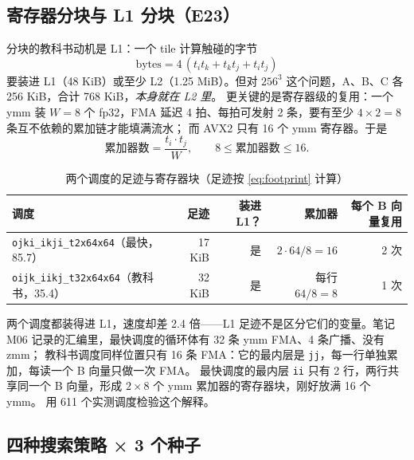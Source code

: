 \documentclass[11pt,a4paper]{ctexart}
\newcommand{\sk}[1]{\texttt{#1}}
\begin{document}
\subsection{寄存器分块与 L1 分块（E23）}\label{sec:regblock}

分块的教科书动机是 L1：一个 tile 计算触碰的字节
\begin{equation*}\label{eq:footprint}
  \text{bytes} = 4\,(t_i t_k + t_k t_j + t_i t_j) \tag{E23a}
\end{equation*}
要装进 L1（48 KiB）或至少 L2（1.25 MiB）。但对 $256^3$ 这个问题，A、B、C 各 256 KiB，合计 768 KiB，\emph{本身就在 L2 里}。
更关键的是寄存器级的复用：一个 ymm 装 $W=8$ 个 fp32，FMA 延迟 4 拍、每拍可发射 2 条，要有至少 $4\times2=8$ 条互不依赖的累加链才能填满流水；
而 AVX2 只有 16 个 ymm 寄存器。于是
\begin{equation*}\label{eq:acc}
  \text{累加器数} = \frac{t_i\cdot t_j}{W},\qquad 8 \le \text{累加器数} \le 16. \tag{E23b}
\end{equation*}

\begin{table}[H]
\centering\small
\caption{两个调度的足迹与寄存器块（足迹按 \cref{eq:footprint} 计算）}\label{tab:footprint}
\begin{tabular}{lrrrr}
\toprule
调度 & 足迹 & 装进 L1？ & 累加器 & 每个 B 向量复用 \\
\midrule
\sk{ojki\_ikji\_t2x64x64}（最快，85.7） & 17 KiB & 是 & $2\cdot64/8=16$ & 2 次 \\
\sk{oijk\_iikj\_t32x64x64}（教科书，35.4） & 32 KiB & 是 & 每行 $64/8=8$ & 1 次 \\
\bottomrule
\end{tabular}
\end{table}

两个调度都装得进 L1，速度却差 2.4 倍——L1 足迹不是区分它们的变量。笔记 M06 记录的汇编里，最快调度的循环体有 32 条 ymm FMA、4 条广播、没有 zmm；
教科书调度同样位置只有 16 条 FMA：它的最内层是 \texttt{jj}，每一行单独累加，每读一个 B 向量只做一次 FMA。
最快调度的最内层 \texttt{ii} 只有 2 行，两行共享同一个 B 向量，形成 $2\times8$ 个 ymm 累加器的寄存器块，刚好放满 16 个 ymm。
 用 611 个实测调度检验这个解释。

\subsection{四种搜索策略 × 3 个种子}\label{sec:strategies}
\end{document}

